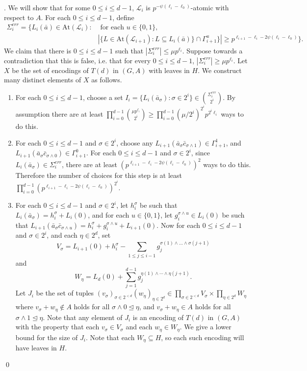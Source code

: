 \documentclass[12pt,oneside,british,a4wide]{amsart}
\numberwithin{equation}{section}
\theoremstyle{definition}
\newcommand{\abar}{\bar{a}}
\newcommand{\cbar}{\bar{c}}
\newcommand{\calL}{\mathcal{L}}
\newcommand{\At}{{\mathrm{At}}}
\newenvironment{proofof}[1]{\indent{\itshape Proof of #1}.\;}{\qed}
\begin{document}
\begin{proofof}{Theorem \ref{thm:almoststableinhstrong}}
We will show that for some $0\leq i\leq d-1$, $\calL_i$ is $p^{-\psi(\ell_i-\ell_0)}$-atomic with respect to $A$.  For each $0\leq i\leq d-1$, define 
\begin{align*}
\Sigma_i^{err}=\{L_i(\abar)\in \At(\calL_i): & \text{ for each }u\in \{0,1\},\\
& |\{L\in \At(\calL_{i+1}): L\subseteq L_i(\abar)\}\cap \Gamma_{i+1}^u\}|
\geq  p^{\ell_{i+1}-\ell_i-2\psi(\ell_i-\ell_0)} \}.
\end{align*}
We claim that there is $0\leq i\leq d-1$ such that $|\Sigma^{err}_i|\leq \mu p^{\ell_i}$. Suppose towards a contradiction that this is false, i.e. that for every $0\leq i\leq d-1$, $|\Sigma_i^{err}|\geq \mu p^{\ell_i}$.  Let $X$ be the set of encodings of $T(d)$ in $(G,A)$ with leaves in $H$.  We construct many distinct elements of $X$ as follows.
\begin{enumerate}
\item[(a)] For each $0\leq i\leq d-1$, choose a set $I_i=\{L_i(\abar_{\sigma}): \sigma\in 2^i\}\in {\Sigma_i^{err}\choose 2^i}$.  By assumption there are at least $\prod_{i=0}^{d-1}{\mu p^{\ell_i}\choose 2^i}\geq \prod_{i=0}^{d-1}(\mu/2^i)^{2^i} p^{2^i \ell_i}$ ways to do this.
\item[(b)] For each $0\leq i\leq d-1$ and $\sigma\in 2^i$, choose any  $L_{i+1}(\abar_{\sigma}\cbar_{\sigma \wedge 1})\in \Gamma_{i+1}^1$, and  $L_{i+1}(\abar_{\sigma}\cbar_{\sigma\wedge 0})\in \Gamma_{i+1}^0$.   For each $0\leq i\leq d-1$ and $\sigma\in 2^i$, since $L_i(\abar_{\sigma})\in \Sigma_i^{err}$, there are at least $(p^{\ell_{i+1}-\ell_i-2\psi(\ell_i-\ell_0)})^2$ ways to do this.  Therefore the number of choices for this step is at least $\prod_{i=0}^{d-1}(p^{\ell_{i+1}-\ell_i-2\psi(\ell_i-\ell_0)})^{2^i}$.
\item[(c)] For each $0\leq i\leq d-1$ and $\sigma\in 2^i$, let $h^{\sigma}_i$ be such that $L_i(\abar_{\sigma})=h^{\sigma}_i+L_i(0)$, and for each $u\in \{0,1\}$, let $g_i^{\sigma \wedge u}\in L_i(0)$ be such that $L_{i+1}(\abar_{\sigma}\cbar_{\sigma\wedge u})=h^{\sigma}_i+g_i^{\sigma \wedge u}+L_{i+1}(0)$.  Now for each $0\leq i\leq d-1$ and $\sigma\in 2^i$, and each $\eta\in 2^d$, set 
\[V_{\sigma}=L_{i+1}(0)+h^{\sigma}_{i}-\sum_{1\leq j\leq i-1}g_j^{\sigma(1)\wedge \ldots \wedge \sigma(j+1)}\]
and
\[W_{\eta}=L_d(0)+\sum_{j=1}^{d-1} g_j^{\eta(1)\wedge \cdots \wedge \eta(j+1)}.\]
Let $J_i$ be the set of tuples $(v_{\sigma})_{\sigma\in 2^{<d}}(w_{\eta})_{\eta \in 2^d}\in \prod_{\sigma\in 2^{<d}}V_{\sigma}\times \prod_{\eta\in 2^d}W_{\eta}$ where $v_{\sigma}+w_{\eta}\notin A$ holds for all  $\sigma \wedge 0\trianglelefteq \eta$, and $v_{\sigma}+w_{\eta}\in A$ holds for all  $\sigma \wedge 1\trianglelefteq \eta$.   Note that any element of $J_i$  is an encoding of $T(d)$ in $(G,A)$  with the property that each $v_{\sigma}\in V_{\sigma}$ and each $w_{\eta}\in W_{\eta}$.  We give a lower bound for the size of $J_i$.   Note that each $W_{\eta}\subseteq H$, so each such encoding will have leaves in $H$.


\end{enumerate}
\end{proofof}
\end{document}
